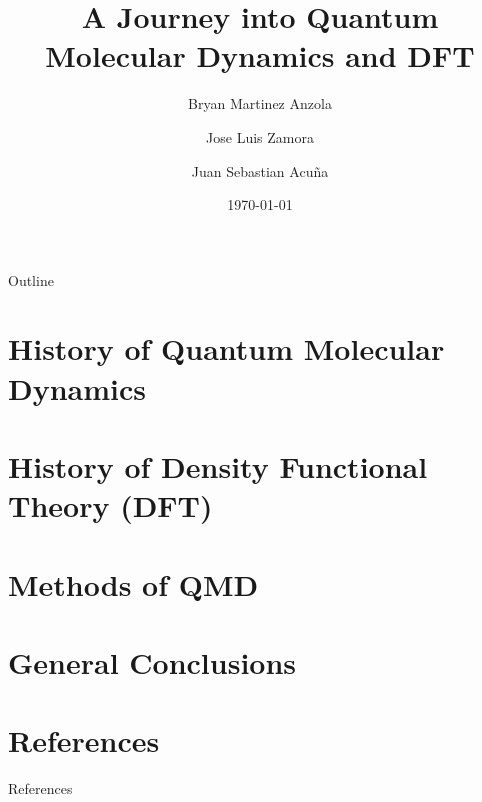 \documentclass{beamer}
\title[QMD \& DFT]{A Journey into Quantum Molecular Dynamics and DFT}
\author{Bryan Martinez Anzola \and Jose Luis Zamora \and Juan Sebastian Acuña}
\institute{Universidad Distrital Francisco José de Caldas}
\date{\today}
\begin{document}
\begin{frame}
    \titlepage
\end{frame}

\begin{frame}{Outline}
    \tableofcontents
\end{frame}


\section{History of Quantum Molecular Dynamics}


\section{History of Density Functional Theory (DFT)}


\section{Methods of QMD}


\section{General Conclusions}


\section{References}

\begin{frame}[allowframebreaks]{References}
    \printbibliography
    \nocite{*}
\end{frame}
\end{document}
